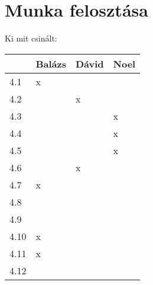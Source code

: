 \section{Munka felosztása}\label{sec:munka-felosztasa}

Ki mit csinált:


\begin{tabular}{ |p{3cm}|p{3cm}|p{3cm}|p{3cm}|  }
    \hline
    &Balázs & Dávid & Noel \\
    \hline
    4.1&x&& \\
    \hline
    4.2&&x& \\
    \hline
    4.3&&&x \\
    \hline
    4.4&&&x \\
    \hline
    4.5&&&x \\
    \hline
    4.6&&x& \\
    \hline
    4.7&x&& \\
    \hline
    4.8&&& \\
    \hline
    4.9&&& \\
    \hline
    4.10&x&& \\
    \hline
    4.11&x&& \\
    \hline
    4.12&&& \\
    \hline
\end{tabular}
